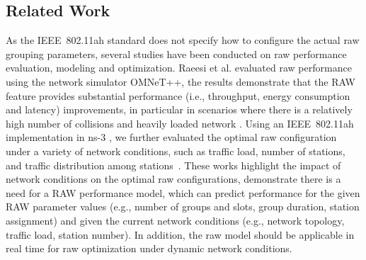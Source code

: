  
\subsection{Related Work \label{subsec:related_work}}


As the IEEE~802.11ah standard does not specify how to configure the actual \gls{raw} grouping parameters, several studies have been conducted on \gls{raw} performance evaluation, modeling and optimization. Raeesi et al. evaluated  \gls{raw} performance using the network simulator OMNeT++, the results demonstrate that the RAW feature provides
substantial performance (i.e., throughput, energy consumption and latency) improvements, in particular in scenarios where there is a relatively high number of collisions and heavily loaded network \cite{Raeesi2014a}. Using an IEEE~802.11ah implementation in ns-3
\cite{WNS32016}, we further evaluated the optimal \gls{raw}  configuration under a variety of network conditions, such as traffic load, number of stations, and traffic distribution among stations~\cite{WoWMoM2016}. These works highlight the impact of network conditions on the optimal \gls{raw} configurations, demonstrate there is a need for a \gls{RAW} performance model, which can predict performance for the given RAW parameter values (e.g., number of groups and slots, group duration, station assignment) and given the current network conditions (e.g., network topology, traffic load, station number). In addition, the \gls{raw} model should be applicable in real time for \gls{raw} optimization under dynamic network conditions.




